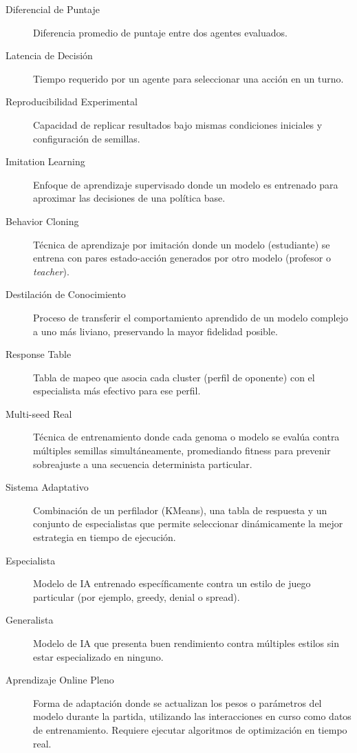 \begin{description}
\item[Diferencial de Puntaje] Diferencia promedio de puntaje entre dos agentes evaluados.

\item[Latencia de Decisión] Tiempo requerido por un agente para seleccionar una acción en un turno.

\item[Reproducibilidad Experimental] Capacidad de replicar resultados bajo mismas condiciones iniciales y configuración de semillas.

\item[Imitation Learning] Enfoque de aprendizaje supervisado donde un modelo es entrenado para aproximar las decisiones de una política base.

\item[Behavior Cloning] Técnica de aprendizaje por imitación donde un modelo (estudiante) se entrena con pares estado-acción generados por otro modelo (profesor o \textit{teacher}).

\item[Destilación de Conocimiento] Proceso de transferir el comportamiento aprendido de un modelo complejo a uno más liviano, preservando la mayor fidelidad posible.

\item[Response Table] Tabla de mapeo que asocia cada cluster (perfil de oponente) con el especialista más efectivo para ese perfil.

\item[Multi-seed Real] Técnica de entrenamiento donde cada genoma o modelo se evalúa contra múltiples semillas simultáneamente, promediando fitness para prevenir sobreajuste a una secuencia determinista particular.

\item[Sistema Adaptativo] Combinación de un perfilador (KMeans), una tabla de respuesta y un conjunto de especialistas que permite seleccionar dinámicamente la mejor estrategia en tiempo de ejecución.

\item[Especialista] Modelo de IA entrenado específicamente contra un estilo de juego particular (por ejemplo, greedy, denial o spread).

\item[Generalista] Modelo de IA que presenta buen rendimiento contra múltiples estilos sin estar especializado en ninguno.

\item[Aprendizaje Online Pleno] Forma de adaptación donde se actualizan los pesos o parámetros del modelo durante la partida, utilizando las interacciones en curso como datos de entrenamiento. Requiere ejecutar algoritmos de optimización en tiempo real.


\end{description}
